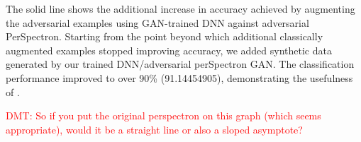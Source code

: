The solid line shows the additional increase in accuracy achieved by augmenting the adversarial examples using GAN-trained DNN against adversarial PerSpectron. Starting from the point beyond which additional classically augmented examples stopped improving accuracy, we added synthetic data generated by our trained DNN/adversarial perSpectron GAN. The classification performance improved to over 90\% (91.14454905), demonstrating the usefulness of \scheme. 

\textcolor{red}{DMT: So if you put the original perspectron on this graph (which seems appropriate), would
it be a straight line or also a sloped asymptote?}





